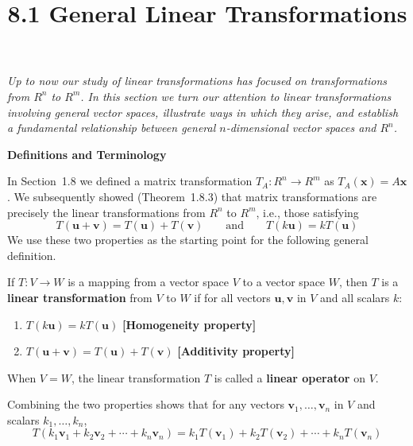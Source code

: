 \documentclass{article}
\title{8.1 General Linear Transformations}
\date{}
\author{}
\newcommand{\redheading}[1]{{\vspace{2mm}\noindent\Large\bfseries\color{red!55!black} #1\par}\vspace{2mm}}
\begin{document}
\maketitle

{\itshape\color{blue!45!black}
Up to now our study of linear transformations has focused on transformations from $R^n$
to $R^m$. In this section we turn our attention to linear transformations involving general
vector spaces, illustrate ways in which they arise, and establish a fundamental relationship
between general $n$-dimensional vector spaces and $R^n$.\par}

\vspace{2mm}

\redheading{Definitions and Terminology}

In Section~1.8 we defined a matrix transformation $T_A : R^n \to R^m$ as $T_A(\mathbf{x}) = A\mathbf{x}$.
We subsequently showed (Theorem~1.8.3) that matrix transformations are precisely the linear
transformations from $R^n$ to $R^m$, i.e., those satisfying
\[
  T(\mathbf{u}+\mathbf{v}) = T(\mathbf{u})+T(\mathbf{v}) \qquad \text{and} \qquad T(k\mathbf{u}) = kT(\mathbf{u})
\]
We use these two properties as the starting point for the following general definition.

\begin{tcolorbox}[colback=teal!4, colframe=teal!65!black,
  title={\textbf{Definition 1}}, boxrule=0.5mm, arc=3mm]
If $T : V \to W$ is a mapping from a vector space $V$ to a vector space $W$, then $T$ is
a \textbf{linear transformation} from $V$ to $W$ if for all vectors $\mathbf{u},\mathbf{v}$ in
$V$ and all scalars $k$:
\begin{enumerate}
  \item[(i)] $T(k\mathbf{u}) = kT(\mathbf{u})$ \hfill \textbf{[Homogeneity property]}
  \item[(ii)] $T(\mathbf{u}+\mathbf{v}) = T(\mathbf{u})+T(\mathbf{v})$ \hfill \textbf{[Additivity property]}
\end{enumerate}
When $V = W$, the linear transformation $T$ is called a \textbf{linear operator} on $V$.
\end{tcolorbox}

Combining the two properties shows that for any vectors $\mathbf{v}_1,\ldots,\mathbf{v}_n$ in $V$
and scalars $k_1,\ldots,k_n$,
\begin{equation}
  T(k_1\mathbf{v}_1 + k_2\mathbf{v}_2 + \cdots + k_n\mathbf{v}_n)
  = k_1 T(\mathbf{v}_1) + k_2 T(\mathbf{v}_2) + \cdots + k_n T(\mathbf{v}_n) \tag{1}
\end{equation}
\end{document}

